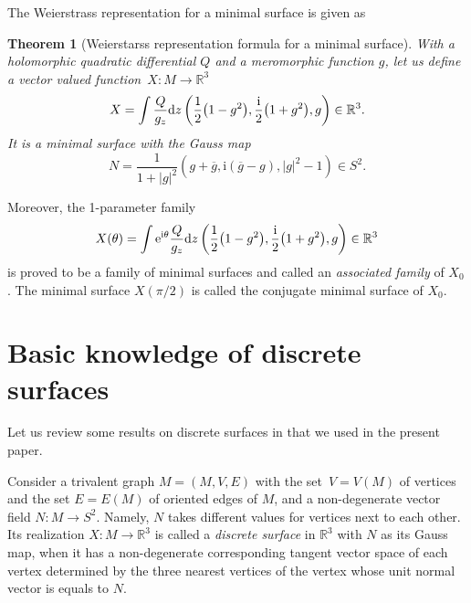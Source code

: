 \documentclass[10pt,a4paper]{amsart}
\newcommand{\R}{\mathbb{R}}
\newcommand{\ii}{{\mathrm{i}}}
\let\Re\relax
\DeclareMathOperator{\Re}{Re}
\let\Re\relax
\DeclareMathOperator{\Re}{{\mathrm Re}}
\newcommand{\1}{{\bf 1}}
\numberwithin{equation}{section}
\newtheorem{Theorem}{Theorem}[section]
\begin{document}
The Weierstrass representation for a minimal surface is given as
\begin{Theorem}[Weierstarss representation formula for a minimal surface]
 With a holomorphic quadratic differential $Q$ and a meromorphic function $g$, let us define
 a vector valued function~${X\colon M \to \R^3}$
 \begin{displaymath}
 X = \Re \int \frac{Q}{g_z}{\rm d}z
 \left(
 \frac{1}{2}\big(1-g^2\big), \frac{\ii}{2}\big(1+g^2\big), g
 \right)
 \in \R^3.
 \end{displaymath}
 It is a minimal surface with the Gauss map
 \begin{displaymath}
 N = \frac{1}{1+|g|^2}\left(g+\overline{g}, \ii (\overline{g}-g), |g|^2-1 \right) \in S^2.
 \end{displaymath}
\end{Theorem}

Moreover, the 1-parameter family
\begin{displaymath}
 X(\theta) = \Re \int {\rm e}^{\ii \theta}\frac{Q}{g_z}{\rm d}z
 \left(
 \frac{1}{2}\big(1-g^2\big), \frac{\ii}{2}\big(1+g^2\big), g
 \right)
 \in \R^3
\end{displaymath}
is proved to be a family of minimal surfaces and called an {\em associated family} of $X_0$.
The minimal surface $X(\pi/2)$ is called the conjugate minimal surface of $X_0$.

\section{Basic knowledge of discrete surfaces}
Let us review some results on discrete surfaces in \cite{kotani-naito-omori, kotani-naito-tao, tao} that we used in the present paper.

\begin{Definition}
 Consider a trivalent graph $M=(M, V, E)$ with the set~${V=V(M)}$ of vertices and the set $E=E(M)$ of oriented edges of $M$,
 and a non-degenerate vector field $N\colon M \to S^2$.
 Namely, $N$ takes different values for vertices next to each other.
 Its realization $X\colon M \to \R^3$ is called a {\em discrete surface} in $\R^3$ with $N$ as its Gauss map,
 when it has a non-degenerate corresponding tangent vector space of each vertex determined
 by the three nearest vertices of the vertex whose unit normal vector is equals to $N$.
\end{Definition}
\end{document}

